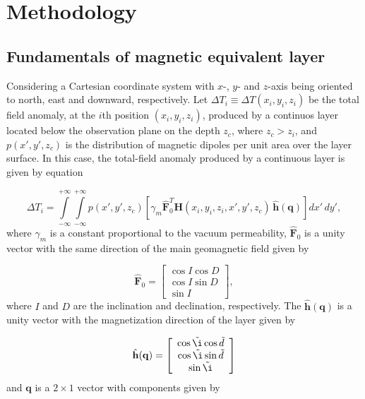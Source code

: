 \section{Methodology}
\label{sec:methodology}

\subsection{Fundamentals of magnetic equivalent layer}
\label{subsec:mag_eqlayer}

Considering a Cartesian coordinate system with $x$-, $y$- and $z$-axis being oriented to north, east and downward, respectively. Let $\Delta T_i \equiv \Delta T (x_i,y_i,z_i)$ be the total field anomaly, at the $i$th position $(x_i,y_i,z_i)$, produced by a continuos layer located below the observation plane on the depth $z_c$, where $z_c > z_i$, and $p(x',y',z_c)$ is the distribution of magnetic dipoles per unit area over the layer surface. In this case, the total-field anomaly produced by a continuous layer is given by equation 

\begin{equation}
\Delta T_i = \int \limits_{-\infty}^{+\infty } \int \limits_{-\infty}^{+\infty }  p(x',y',z_c)  [\gamma_m \hat{\mathbf{F}}_0^T \mathbf{H}(x_i,y_i,z_i,x',y',z_c) \,\hat{\mathbf{h}}(\mathbf{q})] dx' \,dy',
\label{eq:continuous_layer}
\end{equation}
where $\gamma_m$ is a constant proportional to the vacuum permeability, $\hat{\mathbf{F}}_0$ is a unity vector with the same direction of the main geomagnetic field given by

\begin{equation}
	\hat{\mathbf{F}}_0 =
	\left[ \begin{array}{c}
		 \cos I \cos D \\
		 \cos I \sin D \\
		 \sin I     
	\end{array} \right] ,
	\label{eq:main_field}
\end{equation}
where $I$ and $D$ are the inclination and declination, respectively. The $\hat{\mathbf{h}}(\mathbf{q})$ is a unity vector with the magnetization direction of the layer given by 

\begin{equation}
	\hat{\mathbf{h}}(\mathbf{q}) =
	\left[ \begin{array}{c}
		\cos \tilde{\i} \cos \tilde{d} \\
		\cos \tilde{\i} \sin \tilde{d}\\
		\sin \tilde{\i}
	\end{array} \right] 
	\label{eq:mag_vec}
\end{equation}
and $\mathbf{q}$ is a $2 \times 1$ vector with components given by 

